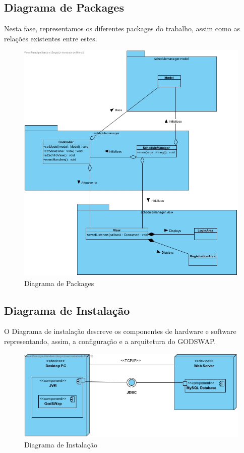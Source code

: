 \documentclass[a4paper]{article}
\begin{document}
\clearpage
\subsection{Diagrama de Packages}
\hspace{3mm}Nesta fase, representamos os diferentes packages do trabalho, assim como as relações existentes entre estes.

\begin{figure}[H]
\centering
\includegraphics[width=14cm]{DiagramaPackages}
\caption{Diagrama de Packages}
\label{}
\end{figure}

\clearpage
\subsection{Diagrama de Instalação}
\hspace{3mm}O Diagrama de instalação descreve os componentes de hardware e software representando, assim, a configuração e a arquitetura do GODSWAP.

\begin{figure}[H]
\centering
\includegraphics[width=14cm]{DiagramaInstalacao}
\caption{Diagrama de Instalação}
\label{}
\end{figure}
\end{document}
